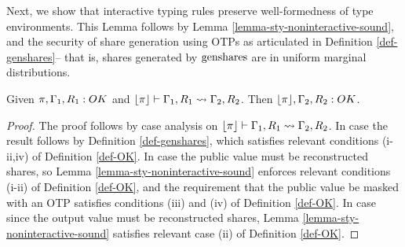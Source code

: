 Next, we show that interactive typing rules preserve well-formedness of type
environments. This Lemma follows by Lemma \ref{lemma-sty-noninteractive-sound},
and the security of share generation using OTPs as articulated in
Definition \ref{def-genshares}-- that is, shares
generated by $\mathrm{genshares}$ are in uniform marginal distributions. 
\begin{lemma}
  \label{lemma-OK}
  Given $\pi,\Gamma_1,R_1  : {OK}$
  and $\lfloor \pi \rfloor  \vdash \Gamma_1, R_1 \leadsto \Gamma_2, R_2$.
  Then $\lfloor \pi \rfloor, \Gamma_2, R_2 : {OK}$.
\end{lemma}
\begin{proof}
  The proof follows by case analysis on  $\lfloor \pi \rfloor  \vdash \Gamma_1, R_1 \leadsto \Gamma_2, R_2$.
  In case  the result follows by Definition \ref{def-genshares},
  which satisfies relevant conditions (i-ii,iv) of Definition \ref{def-OK}. In case
   the public value must be reconstructed shares, so Lemma
  \ref{lemma-sty-noninteractive-sound} enforces relevant conditions (i-ii) of Definition
  \ref{def-OK}, and the requirement that the public value be masked with an OTP satisfies conditions
  (iii) and (iv) of Definition \ref{def-OK}. In case  since
  the output value must be reconstructed shares, Lemma \ref{lemma-sty-noninteractive-sound}
  satisfies relevant case (ii) of  Definition \ref{def-OK}. 
\end{proof}

